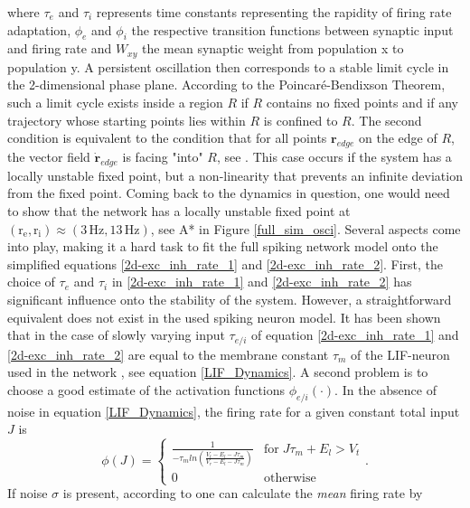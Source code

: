 \documentclass[10pt,a4paper]{article}
\begin{document}
where $\tau_e$ and $\tau_i$ represents time constants representing the rapidity of firing rate adaptation, $\phi_e$ and $\phi_i$ the respective transition functions between synaptic input and firing rate and $W_{xy}$ the mean synaptic weight from population x to population y. A persistent oscillation then corresponds to a stable limit cycle in the 2-dimensional phase plane. According to the Poincaré-Bendixson Theorem, such a limit cycle exists inside a region $R$ if $R$ contains no fixed points and if any trajectory whose starting points lies within $R$ is confined to $R$. The second condition is equivalent to the condition that for all points $\mathbf{r}_{edge}$ on the edge of $R$, the vector field $\dot{\mathbf{r}}_{edge}$ is facing "into" $R$, see \cite[p.~248]{Dyn_Sys_Hirsch}. This case occurs if the system has a locally unstable fixed point, but a non-linearity that prevents an infinite deviation from the fixed point.
Coming back to the dynamics in question, one would need to show that the network has a locally unstable fixed point at $\mathrm{(r_e,r_i)\approx (3\, Hz, 13\, Hz)}$, see A* in Figure \ref{full_sim_osci}. Several aspects come into play, making it a hard task to fit the full spiking network model onto the simplified equations \ref{2d-exc_inh_rate_1} and \ref{2d-exc_inh_rate_2}. First, the choice of $\tau_e$ and $\tau_i$ in \ref{2d-exc_inh_rate_1} and \ref{2d-exc_inh_rate_2} has significant influence onto the stability of the system. However, a straightforward equivalent does not exist in the used spiking neuron model. It has been shown that in the case of slowly varying input $\tau_{e/i}$ of equation \ref{2d-exc_inh_rate_1} and \ref{2d-exc_inh_rate_2} are equal to the membrane constant $\tau_m$ of the LIF-neuron used in the network \cite{Gerstner_Pop_Act}, see equation \ref{LIF_Dynamics}. A second problem is to choose a good estimate of the activation functions $\phi_{e/i}( \cdot )$. In the absence of noise in equation \ref{LIF_Dynamics}, the firing rate for a given constant total input $J$ is
\begin{equation}
\phi(J) = \begin{cases}\frac{1}{-\tau_m ln(\frac{V_t -E_l-J\tau_m}{V_r -E_l-J\tau_m})} & \mathrm{for}\; J\tau_m + E_l > V_t\\
0 & \mathrm{otherwise}
\end{cases}.
\label{LIF_Fir_Rate_no_Noise}
\end{equation}
If noise $\sigma$ is present, according to \cite{Roxin_Firing_Rate_Distribution} one can calculate the \emph{mean} firing rate by
\end{document}
